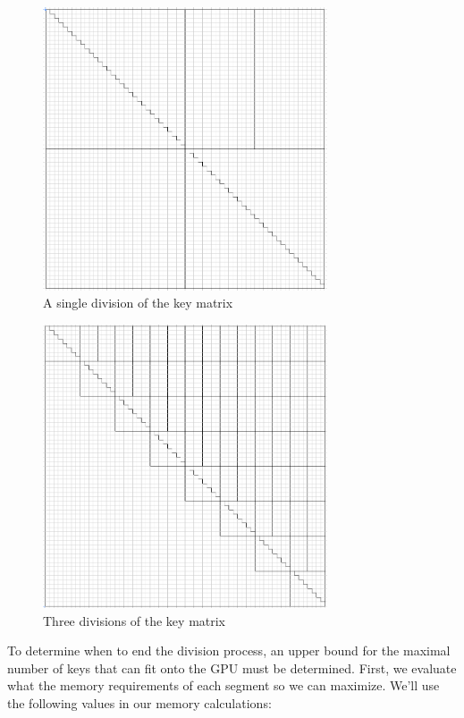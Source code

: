 \documentclass[smallextended]{svjour3}       %
\begin{document}
\begin{figure}
   \centering
   \includegraphics[width=0.75\textwidth]{one_division}
   \caption{A single division of the key matrix}
   \label{fig:divkeys1}
\end{figure}

\begin{figure}
   \centering
   \includegraphics[width=0.75\textwidth]{three_divisions}
   \caption{Three divisions of the key matrix}
   \label{fig:divkeys3}
\end{figure}

To determine when to end the division process, an upper bound for the maximal number of keys that can fit onto the GPU must be determined. First, we evaluate what the memory requirements of each segment so we can maximize. We'll use the following values in our memory calculations:
\end{document}

